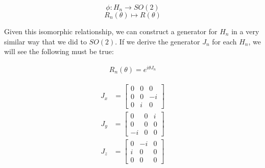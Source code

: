\documentclass[10pt]{ucthesis}
\begin{document}
$$\phi:H_n \rightarrow SO(2)$$
$$R_n(\theta) \mapsto R(\theta)$$

Given this isomorphic relationship, we can construct a generator for $H_n$ in a very similar way that we did to $SO(2)$. If we derive the generator $J_n$ for each $H_n$, we will see the following must be true:

\begin{equation}
	\begin{aligned}
		R_n(\theta) = e^{i\theta J_n}
	\end{aligned}
\end{equation}

\begin{equation}
	\begin{aligned}
		J_x &= \begin{bmatrix}
					0 & 0 & 0 \\
					0 & 0 & -i \\
					0 & i & 0
					\end{bmatrix}
	\end{aligned}
\end{equation}
\begin{equation}
	\begin{aligned}
		J_y &= \begin{bmatrix}
					0 & 0 & i \\
					0 & 0 & 0 \\
					-i & 0 & 0
					\end{bmatrix}
	\end{aligned}
\end{equation}
\begin{equation}
	\begin{aligned}
		J_z &= \begin{bmatrix}
					0 & -i & 0 \\
					i & 0 & 0 \\
					0 & 0 & 0
					\end{bmatrix}
	\end{aligned}
\end{equation}
\end{document}
